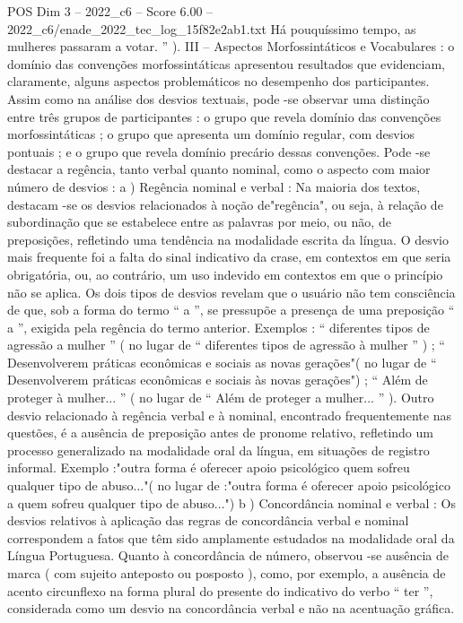 \begin{textsample}{POS Dim 3 – 2022\_c6 – Score 6.00 – 2022\_c6/enade\_2022\_tec\_log\_15f82e2ab1.txt}
Há pouquíssimo tempo, as mulheres passaram a votar. ” ).
III – Aspectos Morfossintáticos e Vocabulares : o domínio das convenções morfossintáticas apresentou resultados que evidenciam, claramente, alguns aspectos problemáticos no desempenho dos participantes.
Assim como na análise dos desvios textuais, pode -se observar uma distinção entre três grupos de participantes : o grupo que revela domínio das convenções morfossintáticas ; o grupo que apresenta um domínio regular, com desvios pontuais ; e o grupo que revela domínio precário dessas convenções.
Pode -se destacar a regência, tanto verbal quanto nominal, como o aspecto com maior número de desvios : a ) Regência nominal e verbal : Na maioria dos textos, destacam -se os desvios relacionados à noção de"regência", ou seja, à relação de subordinação que se estabelece entre as palavras por meio, ou não, de preposições, refletindo uma tendência na modalidade escrita da língua.
O desvio mais frequente foi a falta do sinal indicativo da crase, em contextos em que seria obrigatória, ou, ao contrário, um uso indevido em contextos em que o princípio não se aplica.
Os dois tipos de desvios revelam que o usuário não tem consciência de que, sob a forma do termo “ a ”, se pressupõe a presença de uma preposição “ a ”, exigida pela regência do termo anterior.
Exemplos : “ diferentes tipos de agressão a mulher ” ( no lugar de “ diferentes tipos de agressão à mulher ” ) ; “ Desenvolverem práticas econômicas e sociais as novas gerações"( no lugar de “ Desenvolverem práticas econômicas e sociais às novas gerações") ; “ Além de proteger à mulher... ” ( no lugar de “ Além de proteger a mulher... ” ).
Outro desvio relacionado à regência verbal e à nominal, encontrado frequentemente nas questões, é a ausência de preposição antes de pronome relativo, refletindo um processo generalizado na modalidade oral da língua, em situações de registro informal.
Exemplo :"outra forma é oferecer apoio psicológico quem sofreu qualquer tipo de abuso..."( no lugar de :"outra forma é oferecer apoio psicológico a quem sofreu qualquer tipo de abuso...") b ) Concordância nominal e verbal : Os desvios relativos à aplicação das regras de concordância verbal e nominal correspondem a fatos que têm sido amplamente estudados na modalidade oral da Língua Portuguesa.
Quanto à concordância de número, observou -se ausência de marca ( com sujeito anteposto ou posposto ), como, por exemplo, a ausência de acento circunflexo na forma plural do presente do indicativo do verbo “ ter ”, considerada como um desvio na concordância verbal e não na acentuação gráfica.

\end{textsample}
